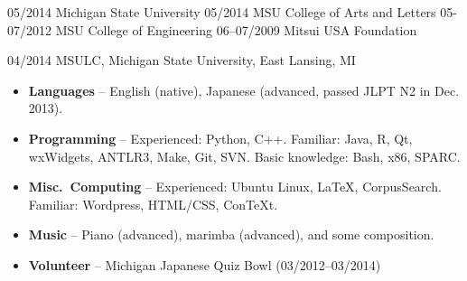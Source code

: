 \documentclass[10pt,oneside]{article}
\begin{document}
	
\begin{reslist}
		{05/2014}
		{Michigan State University}
		{}
		{05/2014}
		{MSU College of Arts and Letters }
		{}
		{05-07/2012}
		{MSU College of Engineering}
		{}
		{06--07/2009}
		{Mitsui USA Foundation}
		{}
\end{reslist}

\begin{reslist}
		{04/2014}
		{MSULC, Michigan State University, East Lansing, MI}
		{}
\end{reslist}




\begin{itemize}
	\item \textbf{Languages} -- English (native), Japanese (advanced, passed JLPT N2 in Dec. 2013).
	
	\item \textbf{Programming} -- Experienced: Python, C++. Familiar: Java, R, Qt, wxWidgets, ANTLR3, Make, Git, SVN. Basic knowledge: Bash, x86, SPARC.
	
	\item \textbf{Misc.\ Computing} -- Experienced: Ubuntu Linux, \LaTeX{}, CorpusSearch. Familiar: Wordpress, HTML/CSS, ConTeXt.
	
	\item \textbf{Music} --  Piano (advanced), marimba (advanced), and some composition.
	
	\item \textbf{Volunteer} -- Michigan Japanese Quiz Bowl (03/2012--03/2014)
\end{itemize}
\end{document}
